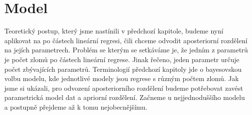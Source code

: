 \documentclass[czech,master,public,dept470,male,cpdeclaration,oneside, python]{diploma}
\begin{document}
%
\section{Model}
Teoretický postup, který jsme nastínili v předchozí kapitole, budeme nyní aplikovat na po částech lineární regresi, čili chceme odvodit aposteriorní rozdělení na jejích parametrech. Problém se kterým se setkáváme je, že jedním z parametrů je počet zlomů po částech lineární regrese. Jinak řečeno, jeden parametr určuje počet zbývajících parametrů. Terminologií předchozí kapitoly jde o bayesovskou volbu modelu, kde jednotlivé modely jsou regrese s různým počtem zlomů. Jak jsme si ukázali, pro odvození aposteriorního rozdělení budeme potřebovat zavést parametrická model dat a apriorní rozdělení. Začneme u nejjednoduššího modelu a postupně přejdeme až k tomu nejobecnějšímu.
\par \par
\end{document}
